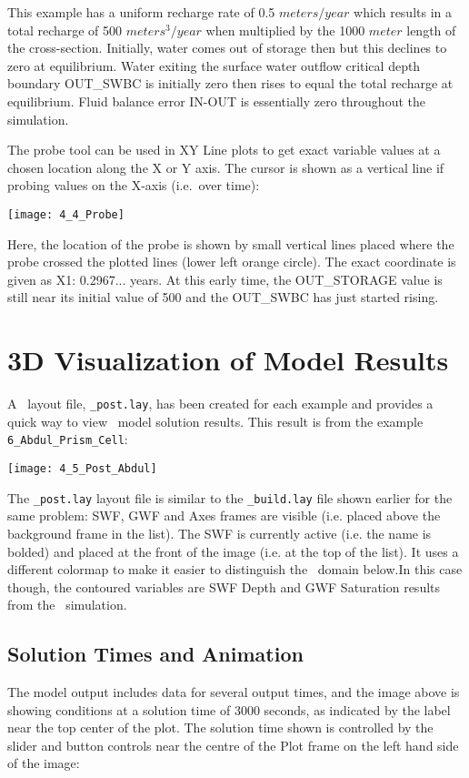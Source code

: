 This example has a uniform recharge rate of 0.5 $meters/year$ which results in a total recharge of 500 $meters^{3}/year$ when multiplied by the 1000 $meter$ length of the cross-section. Initially, water comes out of storage then but this declines to zero at equilibrium.  Water exiting the surface water outflow critical depth boundary  {\sf OUT\_SWBC} is initially zero then rises to equal the total recharge at equilibrium.  Fluid balance error {\sf IN-OUT} is essentially zero throughout the simulation.

The probe tool can be used in {\sf XY Line} plots to get exact variable values at a chosen location along the X or Y axis.  The cursor is shown as a vertical line if probing values on the X-axis (i.e.\ over time):

        \texttt{[image: 4\_4\_Probe]}

Here, the location of the probe is shown by small vertical lines placed where the probe crossed the plotted lines (lower left orange circle).  The exact coordinate is given as {\sf X1: 0.2967...}  years.  At this early time, the {\sf OUT\_STORAGE} value is still near its initial value of 500 and the {\sf OUT\_SWBC} has just started rising.

\section{3D Visualization of Model Results}
A \tecplot\ layout file, \texttt{\_post.lay}, has been created for each example and  provides a quick way to view \mfus\ model solution results.  This result is from the example {\tt 6\_Abdul\_Prism\_Cell}:

        \texttt{[image: 4\_5\_Post\_Abdul]}

The {\tt \_post.lay} layout file is similar to the {\tt \_build.lay} file shown earlier for the same problem: {\sf  SWF, GWF} and {\sf Axes} frames are visible (i.e. placed above the {\sf background} frame in the list).  The {\sf SWF} is currently active (i.e. the name is bolded) and placed at the front of the image (i.e. at the top of the list). It uses a different colormap to make it easier to distinguish the \gwf\ domain below.In this case though, the contoured variables are {\sf SWF Depth} and {\sf GWF Saturation} results from the \mfus\ simulation.

\subsection{Solution Times and Animation}
The model output includes data for several output times, and the image above is showing conditions at a solution time of 3000 seconds, as indicated by the label near the top center of the plot.  The solution time shown is controlled by the slider and button controls near the centre of the {\sf Plot} frame on the left hand side of the image:

